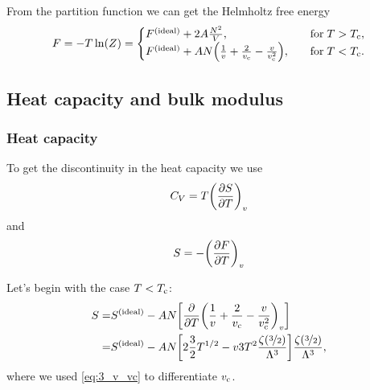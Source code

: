 \documentclass[11pt,letter, swedish, english
]{article}
\begin{document}
From the partition function we can get the Helmholtz free energy
\begin{equation}
F=-T\ln(Z)=
\begin{cases}
\ideal{F}+2A\frac{N^2}{V}\qcomma &\text{for}\;T>\Tc,\\
\ideal{F}
+AN\qty(\frac{1}{v}+\frac{2}{\vc}-\frac{v}{\vc^2})
\qcomma&\text{for}\;T<\Tc.
\end{cases}
\end{equation}


\subsection{Heat capacity and bulk modulus}

\subsubsection{Heat capacity}
To get the discontinuity in the heat capacity we use
\begin{equation}
C_V=T\qty(\pdv{S}{T})_v
\end{equation}
and 
\begin{equation}
S=-\qty(\pdv{F}{T})_v
\end{equation}

Let's begin with the case $T<T_{\text{c}}$:
\begin{equation}
\begin{aligned}
S=&S^\text{{(ideal)}}-AN\qty[\pdv{T}\qty(\frac{1}{v}+\frac{2}{v_{\text{c}}}-\frac{v}{v_{\text{c}}^2})_v]\\
=&S^\text{{(ideal)}}-AN\qty[2\frac{3}{2}T^{1/2}-v3T^2\frac{\zeta(\nicefrac{3}{2})}{\Lambda^3}]
\frac{\zeta(\nicefrac{3}{2})}{\Lambda^3},
\end{aligned}
\end{equation}
where we used \eqref{eq:3_v_vc} to differentiate $v_{\text{c}}$.
\end{document}
